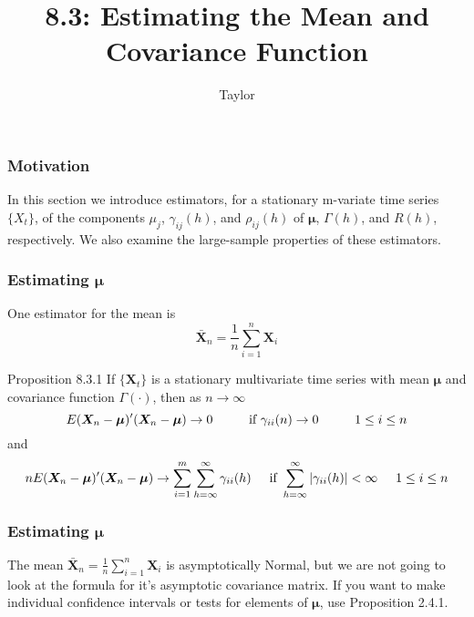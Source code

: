 \documentclass{beamer}
\title["8.3"]{8.3: Estimating the Mean and Covariance Function}
\author{Taylor}
\institute[UVA] 
{
University of Virginia \\
\medskip
\textit{} 
}
\date{}
\begin{document}

\begin{frame}
\titlepage 
\end{frame}

\begin{frame}
\frametitle{Motivation}

In this section we introduce estimators, for a stationary m-variate time series $\{X_t\}$, of the components $\mu_j$, $\gamma_{ij}(h)$, and $\rho_{ij}(h)$ of $\bm{\mu}$, $\Gamma(h)$, and $R(h)$, respectively. We also examine the large-sample properties of these estimators.

\end{frame}


\begin{frame}
\frametitle{Estimating $\bm{\mu}$}

One estimator for the mean is 
\[
\bm{\bar{X}}_n = \frac{1}{n}\sum_{i=1}^n \bm{X}_i
\]

\begin{block}{Proposition 8.3.1}
If $\{\bm{X}_t\}$ is a stationary multivariate time series with mean $\bm{\mu}$ and covariance function $\Gamma(\cdot)$, then as $n\to \infty$
\[
E(\bm{X}_n - \bm{\mu})'(\bm{X}_n - \bm{\mu}) \to 0 \hspace{10mm} \text{if } \gamma_{ii}(n) \to 0 \hspace{10mm} 1 \le i \le n
\]
and
\[
nE(\bm{X}_n - \bm{\mu})'(\bm{X}_n - \bm{\mu}) \to \sum_{i=1}^m \sum_{h=\infty}^{\infty} \gamma_{ii}(h) \hspace{5mm} \text{if }  \sum_{h=\infty}^{\infty}| \gamma_{ii}(h)|< \infty \hspace{5mm} 1 \le i \le n
\]
\end{block}


\end{frame}


\begin{frame}
\frametitle{Estimating $\bm{\mu}$}

The mean $\bm{\bar{X}}_n = \frac{1}{n}\sum_{i=1}^n \bm{X}_i$ is asymptotically Normal, but we are not going to look at the formula for it's asymptotic covariance matrix. If you want to make individual confidence intervals or tests for elements of $\bm{\mu}$, use Proposition 2.4.1.




\end{frame}
\end{document}
